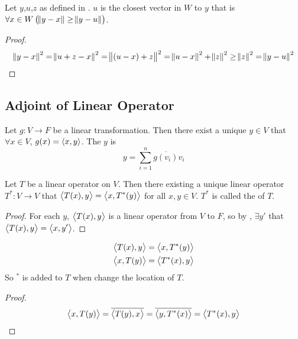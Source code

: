 \begin{theorem}
    Let $y$,$u$,$z$ as defined in . $u$ is the closest vector in $W$ to $y$ that is $\forall x \in W \left(\norm{y-x} \geq \norm{y - u} \right)$.
\end{theorem}
\begin{proof}
    \begin{equation*}
        \norm{y - x}^2 = \norm{u + z - x}^2 = \norm{(u - x) + z}^2 = \norm{u - x}^2 + \norm{z}^2 \geq \norm{z}^2 = \norm{y - u}^2
    \end{equation*}
\end{proof}







\subsection{Adjoint of Linear Operator}

\begin{theorem}\label{uniquelinearoperatortof}
    Let $g: V \rightarrow F$ be a linear transformation. Then there exist a unique $y \in V$ that $\forall x \in V$, $g(x) = \left\langle \displaystyle x, y \right\rangle$. The $y$ is 
    \begin{equation}
        y = \sum_{i=1}^n \overline{g(v_i)} v_i
    \end{equation}
\end{theorem}

\begin{theorem}
    Let $T$ be a linear operator on $V$. Then there existing a unique linear operator $T^* : V \rightarrow V$ that $\left\langle \displaystyle T(x), y \right\rangle=\left\langle \displaystyle x, T^*(y) \right\rangle$ for all $x,y \in V$. $T^*$ is called the  of $T$.
\end{theorem}
\begin{proof}
    For each $y$, $\left\langle \displaystyle T(x), y \right\rangle$ is a linear operator from $V$ to $F$, so by , $\exists y'$ that $\left\langle \displaystyle T(x), y \right\rangle = \left\langle \displaystyle x, y' \right\rangle$.
\end{proof}

\begin{theorem}
    \begin{equation}
        \begin{aligned}
            \left\langle \displaystyle T(x), y \right\rangle &= \left\langle \displaystyle x, T^*(y) \right\rangle \\
            \left\langle \displaystyle x, T(y) \right\rangle &= \left\langle \displaystyle T^*(x), y \right\rangle
        \end{aligned}        
    \end{equation}
    So $^*$ is added to $T$ when change the location of $T$.
\end{theorem}
\begin{proof}
    \begin{equation*}
        \left\langle \displaystyle x, T(y) \right\rangle = \overline{\left\langle \displaystyle T(y), x \right\rangle} = \overline{\left\langle \displaystyle y, T^*(x) \right\rangle} = \left\langle \displaystyle T^*(x), y \right\rangle
    \end{equation*}
\end{proof}

